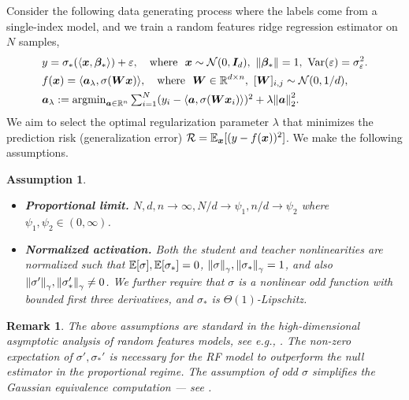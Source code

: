 \documentclass{article} %
\newtheorem{assumption}{Assumption}
\newtheorem{remark}{Remark}
\begin{document}
Consider the following data generating process where the labels come from a single-index model, and we train a random features ridge regression estimator on $N$ samples, 
\begin{align*}
    &y = \sigma_*(\langle{\boldsymbol x},{\boldsymbol \beta}_*\rangle) + \varepsilon, \quad \text{where~ } {\boldsymbol x}\sim\mathcal{N}(0,{\boldsymbol I}_d), ~ \norm{{\boldsymbol \beta}_*}=1, ~\mathrm{Var}(\varepsilon) = \sigma_\varepsilon^2. \\
    &f({\boldsymbol x}) = \langle{\boldsymbol a}_\lambda, \sigma({\boldsymbol W}{\boldsymbol x})\rangle, 
    \quad \text{where~ } {\boldsymbol W}\in\mathbb{R}^{d\times n}, ~
    [{\boldsymbol W}]_{i,j}\sim \mathcal{N}(0,1/d), \\
    &\textstyle{\boldsymbol a}_\lambda := \mathrm{argmin}_{{\boldsymbol a}\in\mathbb{R}^n} \sum_{i=1}^N (y_i - \langle{\boldsymbol a}, \sigma({\boldsymbol W}{\boldsymbol x}_i)\rangle)^2 + \lambda\norm{{\boldsymbol a}}_2^2. 
\end{align*}
We aim to select the optimal regularization parameter $\lambda$ that minimizes the prediction risk (generalization error) ${\mathcal R}=\mathbb{E}_{{\boldsymbol x}} [(y - f({\boldsymbol x}))^2]$. We make the following assumptions. 
\begin{assumption}\,
\begin{itemize}[leftmargin=*,topsep=0mm,itemsep=0mm]
    \item \textbf{Proportional limit.}  $N,d,n\to\infty, N/d\to\psi_1, n/d\to\psi_2$ where $\psi_1,\psi_2\in (0,\infty)$. 
    \item \textbf{Normalized activation.} Both the student and teacher nonlinearities are normalized such that $\mathbb{E}[\sigma],\mathbb{E}[\sigma_*]=0$, $\norm{\sigma}_\gamma,\norm{\sigma_*}_\gamma=1$, and also $\norm{\sigma'}_\gamma,\norm{\sigma_*'}_\gamma\neq 0$. We further require that $\sigma$ is a nonlinear odd function with bounded first three derivatives, and $\sigma_*$ is $\Theta(1)$-Lipschitz.
\end{itemize}
\label{assumption:RF}
\end{assumption}
\begin{remark}
The above assumptions are standard in the high-dimensional asymptotic analysis of random features models, see e.g., \cite{mei2022generalization,gerace2020generalisation}. The non-zero expectation of $\sigma',\sigma_*'$ is necessary for the RF model to outperform the null estimator in the proportional regime. The assumption of odd $\sigma$ simplifies the Gaussian equivalence computation --- see \cite{hu2022universality,ba2022high}. 
\end{remark}
\end{document}

